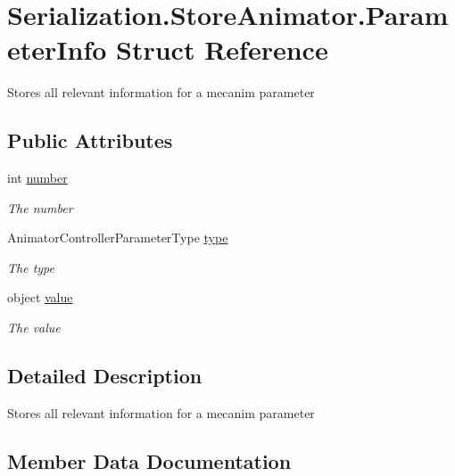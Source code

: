 \hypertarget{struct_serialization_1_1_store_animator_1_1_parameter_info}{}\section{Serialization.\+Store\+Animator.\+Parameter\+Info Struct Reference}
\label{struct_serialization_1_1_store_animator_1_1_parameter_info}


Stores all relevant information for a mecanim parameter  


\subsection*{Public Attributes}
\begin{DoxyCompactItemize}
\item 
int \hyperlink{struct_serialization_1_1_store_animator_1_1_parameter_info_ae5c21ce75e39d49cf2d01476b178d717}{number}
\begin{DoxyCompactList}\small\item\em The number \end{DoxyCompactList}\item 
Animator\+Controller\+Parameter\+Type \hyperlink{struct_serialization_1_1_store_animator_1_1_parameter_info_ae49055557d5f038a50c46db0a4368d7e}{type}
\begin{DoxyCompactList}\small\item\em The type \end{DoxyCompactList}\item 
object \hyperlink{struct_serialization_1_1_store_animator_1_1_parameter_info_aec28e818c8a5b996b62b07939447bef1}{value}
\begin{DoxyCompactList}\small\item\em The value \end{DoxyCompactList}\end{DoxyCompactItemize}


\subsection{Detailed Description}
Stores all relevant information for a mecanim parameter 



\subsection{Member Data Documentation}
\mbox{\label{struct_serialization_1_1_store_animator_1_1_parameter_info_ae5c21ce75e39d49cf2d01476b178d717}} 
